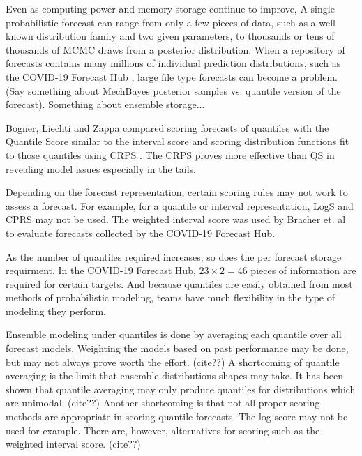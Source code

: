 \documentclass{article}\usepackage[]{graphicx}\usepackage[]{color}
\begin{document}
Even as computing power and memory storage continue to improve, 
A single probabilistic forecast can range from only a few pieces of data, such 
as a well known distribution family and two given parameters, to thousands or
tens of thousands of MCMC draws from a posterior distribution. When a repository
of forecasts contains many millions of individual prediction distributions, such
as the COVID-19 Forecast Hub \cite{Cramer2021-hub-dataset}, large file type forecasts can become a 
problem. (Say something about MechBayes posterior samples vs. quantile version
of the forecast).
Something about ensemble storage...





Bogner, Liechti and Zappa compared scoring forecasts of quantiles with the 
Quantile Score similar to the interval score and scoring distribution functions
fit to those quantiles using CRPS \cite{bogner2017combining}. 
The CRPS proves more effective than QS in 
revealing model issues especially in the tails.

Depending on the forecast representation, certain scoring rules may not work to 
assess a forecast. For example, for a quantile or interval representation, LogS
and CPRS may not be used. The weighted interval score was used by Bracher et. al
to evaluate forecasts collected by the COVID-19 Forecast Hub. 
\cite{bracher2021evaluating}







As the number of quantiles required increases, so does the per forecast storage 
requirment. In the COVID-19 Forecast Hub, $23\times 2 = 46$ pieces of 
information are required for certain targets. And because quantiles are easily 
obtained from most methods of probabilistic modeling, teams have much 
flexibility in the type of modeling they perform. 

Ensemble modeling under quantiles is done by averaging each quantile over all 
forecast models. Weighting the models based on past performance may be done, but
may not always prove worth the effort. (cite??) A shortcoming of quantile
averaging is the limit that ensemble distributions shapes may take. It has been
shown that quantile averaging may only produce quantiles for distributions which
are unimodal. (cite??) Another shortcoming is that not all proper scoring
methods are appropriate in scoring quantile forecasts. The log-score may not be 
used for example. There are, however, alternatives for scoring such as the
weighted interval score. (cite??)
\end{document}
